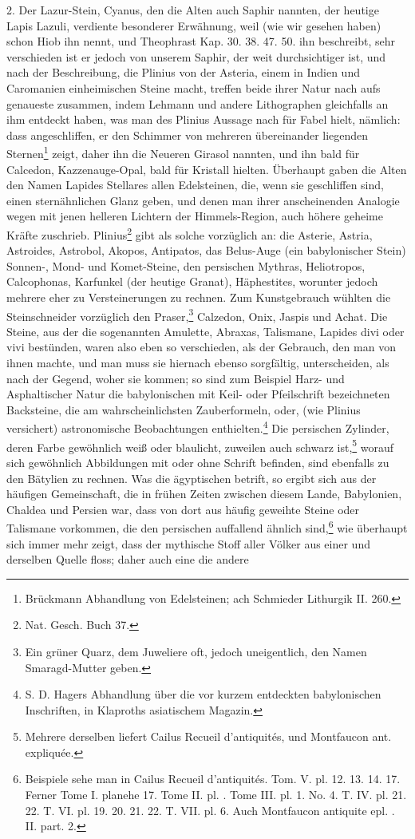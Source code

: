 \documentclass[a4paper, 11pt, oneside, polutonikogreek, german]{article}
\begin{document}
2. Der Lazur-Stein, Cyanus, den die Alten auch Saphir nannten, der heutige Lapis Lazuli, verdiente besonderer Erwähnung, weil (wie wir gesehen haben) schon Hiob ihn nennt, und Theophrast Kap. 30. 38. 47. 50. ihn beschreibt, sehr verschieden ist er jedoch von unserem Saphir, der weit durchsichtiger ist, und nach der Beschreibung, die Plinius von der Asteria, einem in Indien und Caromanien einheimischen Steine macht, treffen beide ihrer Natur nach aufs genaueste zusammen, indem Lehmann und andere Lithographen gleichfalls an ihm entdeckt haben, was man des Plinius Aussage nach für Fabel hielt, nämlich: dass angeschliffen, er den Schimmer von mehreren übereinander liegenden Sternen\footnote{Brückmann Abhandlung von Edelsteinen; ach Schmieder Lithurgik II. 260.} zeigt, daher ihn die Neueren Girasol nannten, und ihn bald für Calcedon, Kazzenauge-Opal, bald für Kristall hielten. Überhaupt gaben die Alten den Namen Lapides Stellares allen Edelsteinen, die, wenn sie geschliffen sind, einen sternähnlichen Glanz geben, und denen man ihrer anscheinenden Analogie wegen mit jenen helleren Lichtern der Himmels-Region, auch höhere geheime Kräfte zuschrieb. Plinius\footnote{Nat. Gesch. Buch 37.} gibt als solche vorzüglich an: die Asterie, Astria, Astroides, Astrobol, Akopos, Antipatos, das Belus-Auge (ein babylonischer Stein) Sonnen-, Mond- und Komet-Steine, den persischen Mythras, Heliotropos, Calcophonas, Karfunkel (der heutige Granat), Häphestites, worunter jedoch mehrere eher zu Versteinerungen zu rechnen. Zum Kunstgebrauch wühlten die Steinschneider vorzüglich den Praser,\footnote{Ein grüner Quarz, dem Juweliere oft, jedoch uneigentlich, den Namen Smaragd-Mutter geben.} Calzedon, Onix, Jaspis und Achat. Die Steine, aus der die sogenannten Amulette, Abraxas, Talismane, Lapides divi oder vivi bestünden, waren also eben so verschieden, als der Gebrauch, den man von ihnen machte, und man muss sie hiernach ebenso sorgfältig, unterscheiden, als nach der Gegend, woher sie kommen; so sind zum Beispiel Harz- und Asphaltischer Natur die babylonischen mit Keil- oder Pfeilschrift bezeichneten Backsteine, die am wahrscheinlichsten Zauberformeln, oder, (wie Plinius versichert) astronomische Beobachtungen enthielten.\footnote{S. D. Hagers Abhandlung über die vor kurzem entdeckten babylonischen Inschriften, in Klaproths asiatischem Magazin.} Die persischen Zylinder, deren Farbe gewöhnlich weiß oder blaulicht, zuweilen auch schwarz ist,\footnote{Mehrere derselben liefert Cailus Recueil d'antiquités, und Montfaucon ant. expliquée.} worauf sich gewöhnlich Abbildungen mit oder ohne Schrift befinden, sind ebenfalls zu den Bätylien zu rechnen. Was die ägyptischen betrift, so ergibt sich aus der häufigen Gemeinschaft, die in frühen Zeiten zwischen diesem Lande, Babylonien, Chaldea und Persien war, dass von dort aus häufig geweihte Steine oder Talismane vorkommen, die den persischen auffallend ähnlich sind,\footnote{Beispiele sehe man in Cailus Recueil d'antiquités. Tom. V. pl. 12. 13. 14. 17. Ferner Tome I. planehe 17. Tome II. pl. . Tome III. pl. 1. No. 4. T. IV. pl. 21. 22. T. VI. pl. 19. 20. 21. 22. T. VII. pl. 6. Auch Montfaucon antiquite epl. . II. part. 2.} wie überhaupt sich immer mehr zeigt, dass der mythische Stoff aller Völker aus einer und derselben Quelle floss; daher auch eine die andere 
\end{document}
